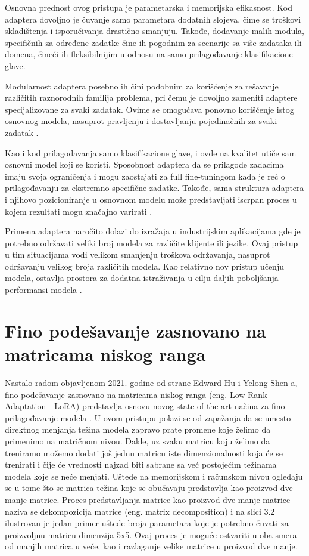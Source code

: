 \documentclass[12pt,oneside]{memoir}
\begin{document}
Osnovna prednost ovog pristupa je parametarska i memorijska efikasnost. Kod adaptera dovoljno je čuvanje samo parametara dodatnih slojeva, čime se troškovi skladištenja i isporučivanja drastično smanjuju. Takođe, dodavanje malih modula, specifičnih za određene zadatke čine ih pogodnim za scenarije sa više zadataka ili domena, čineći ih fleksibilnijim u odnosu na samo prilagođavanje klasifikacione glave.

Modularnost adaptera posebno ih čini podobnim za korišćenje za rešavanje različitih raznorodnih familija problema, pri čemu je dovoljno zameniti adaptere specijalizovane za svaki zadatak. Ovime se omogućava ponovno korišćenje istog osnovnog modela, nasuprot pravljenju i dostavljanju pojedinačnih za svaki zadatak \cite{bapna2019adapteradaptation}.

Kao i kod prilagođavanja samo klasifikacione glave, i ovde na kvalitet utiče sam osnovni model koji se koristi. Sposobnost adaptera da se prilagode zadacima imaju svoja ograničenja i mogu zaostajati za full fine-tuningom kada je reč o prilagođavanju za ekstremno specifične zadatke. Takođe, sama struktura adaptera i njihovo pozicioniranje u osnovnom modelu može predstavljati iscrpan proces u kojem rezultati mogu značajno varirati \cite{he2021adaptereffectiveness}.

Primena adaptera naročito dolazi do izražaja u industrijskim aplikacijama gde je potrebno održavati veliki broj modela za različite klijente ili jezike. Ovaj pristup u tim situacijama vodi velikom smanjenju troškova održavanja, nasuprot održavanju velikog broja različitih modela. Kao relativno nov pristup učenju modela, ostavlja prostora za dodatna istraživanja u cilju daljih poboljšanja performansi modela \cite{pfeiffer2020adapterapplications}.


\section {Fino podešavanje zasnovano na matricama niskog ranga}
Nastalo radom objavljenom 2021. godine od strane Edward Hu i Yelong Shen-a, fino podešavanje zasnovano na matricama niskog ranga (eng. Low-Rank Adaptation - LoRA) predstavlja osnovu novog state-of-the-art načina za fino prilagođavanje modela \cite{LoRATechnique}. U ovom pristupu polazi se od zapažanja da se umesto direktnog menjanja težina modela zapravo prate promene koje želimo da primenimo na matričnom nivou. Dakle, uz svaku matricu koju želimo da treniramo možemo dodati još jednu matricu iste dimenzionalnosti koja će se trenirati i čije će vrednosti najzad biti sabrane sa već postojećim težinama modela koje se neće menjati. Uštede na memorijskom i računskom nivou ogledaju se u tome što se matrica težina koje se obučavaju predstavlja kao proizvod dve manje matrice. 
Proces predstavljanja matrice kao proizvod dve manje matrice naziva se dekompozicija matrice (eng. matrix decomposition) i na slici 3.2 ilustrovan je jedan primer uštede broja parametara koje je potrebno čuvati za proizvoljnu matricu dimenzija 5x5. Ovaj proces je moguće ostvariti u oba smera - od manjih matrica u veće, kao i razlaganje velike matrice u proizvod dve manje.
\end{document}
